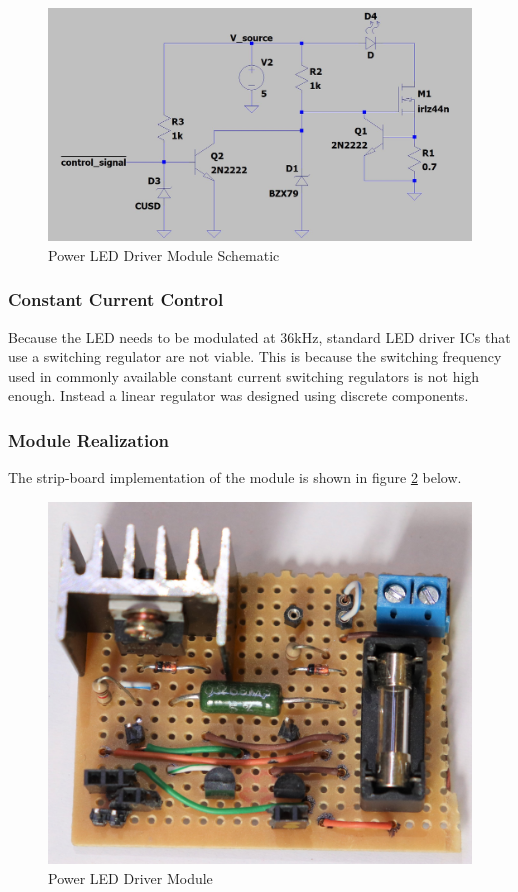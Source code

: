 \begin{figure}[H]
	\centering
	\includegraphics[width=.8\textwidth]{figures/design/power_led_driver.JPG}
	\caption{Power LED Driver Module Schematic}
	\label{fig:schematic_power_led_driver}
\end{figure}

\subsubsection{Constant Current Control}

Because the LED needs to be modulated at 36kHz, standard LED driver ICs that use a switching regulator are not viable. This is because the switching frequency used in commonly available constant current switching regulators is not high enough. Instead a linear regulator was designed using discrete components.



\subsubsection{Module Realization}
The strip-board implementation of the module is shown in figure \ref{fig:module_power_led_driver} below.

\begin{figure}[H]
	\centering
	\includegraphics[width=.6\textwidth]{figures/modules/power_led_driver.jpg}
	\caption{Power LED Driver Module}
	\label{fig:module_power_led_driver}
\end{figure}



